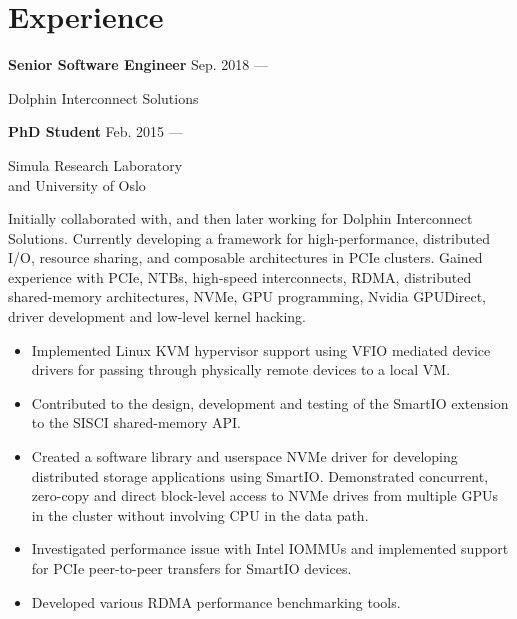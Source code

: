\section{Experience}
\parbox[t][][t]{\linewidth}{
	\parbox{\linewidth}{\textbf{Senior Software Engineer}
		\hfill {{Sep. 2018 --- \phantom{Jun. 2019}}}}
		\smallbreak
	\parbox{\linewidth}{Dolphin Interconnect Solutions}
	\smallbreak
	\parbox{\linewidth}{\textbf{PhD Student}
		\hfill {{Feb. 2015 --- \phantom{Jun. 2019}}}}
		\smallbreak
	\parbox{\linewidth}{Simula Research Laboratory\\and University of Oslo}
	
	\bigskip
	Initially collaborated with, and then later working for Dolphin Interconnect Solutions.
	Currently developing a framework for high-performance, distributed I/O, resource sharing,
	and composable architectures in PCIe clusters.
	Gained experience with PCIe, NTBs, high-speed interconnects, RDMA, distributed shared-memory
	architectures, NVMe, GPU programming, Nvidia GPUDirect, driver development and low-level kernel hacking.

	\bigskip
	\begin{itemize}
		\item{Implemented Linux KVM hypervisor support using VFIO mediated device drivers
			for passing through physically remote devices to a local VM.}\\[-.6em]
		\item{Contributed to the design, development and testing of the SmartIO
			extension to the SISCI shared-memory API.}\\[-.6em]
		\item{Created a software library and userspace NVMe driver 
			for developing distributed storage applications using SmartIO.
			Demonstrated concurrent, zero-copy and direct block-level access to NVMe drives from
			multiple GPUs in the cluster without involving CPU in the data path.}\\[-.6em]
		\item{Investigated performance issue with Intel IOMMUs and
			implemented support for PCIe peer-to-peer transfers for SmartIO devices.}\\[-.6em]
		\item{Developed various RDMA performance benchmarking tools.}
	\end{itemize}
	\bigskip
	\bigskip
}

